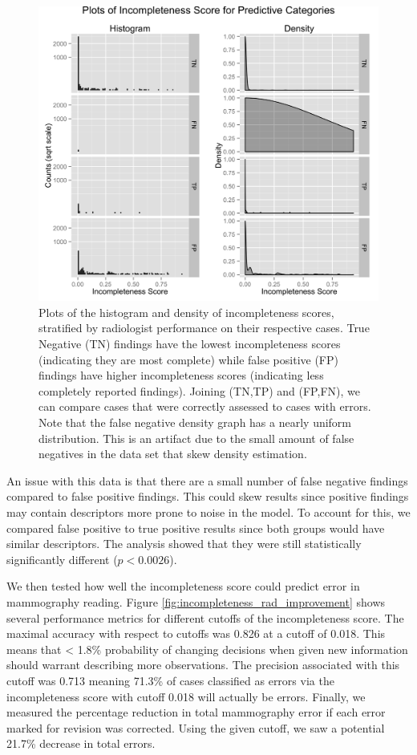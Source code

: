 \begin{figure}
\centering
\includegraphics[width=\linewidth]{figures/incompleteness_score_hist_confmat}
\caption{Plots of the histogram and density of incompleteness scores, stratified by radiologist performance on their respective cases. True Negative (TN) findings have the lowest incompleteness scores (indicating they are most complete) while false positive (FP) findings have higher incompleteness scores (indicating less completely reported findings). Joining (TN,TP) and (FP,FN), we can compare cases that were correctly assessed to cases with errors. Note that the false negative density graph has a nearly uniform distribution. This is an artifact due to the small amount of false negatives in the data set that skew density estimation.}
\label{fig:incompleteness_score_hist_confmat}
\end{figure}


An issue with this data is that there are a small number of false negative findings compared to false positive findings. This could skew results since positive findings may contain descriptors more prone to noise in the model. To account for this, we compared false positive to true positive results since both groups would have similar descriptors. The analysis showed that they were still statistically significantly different ($p<0.0026$).

\clearpage

We then tested how well the incompleteness score could predict error in mammography reading. Figure \ref{fig:incompleteness_rad_improvement} shows several performance metrics for different cutoffs of the incompleteness score. The maximal accuracy with respect to cutoffs was 0.826 at a cutoff of 0.018. This means that < 1.8\% probability of changing decisions when given new information should warrant describing more observations. The precision associated with this cutoff was 0.713 meaning 71.3\% of cases classified as errors via the incompleteness score with cutoff 0.018 will actually be errors. Finally, we measured the percentage reduction in total mammography error if each error marked for revision was corrected. Using the given cutoff, we saw a potential 21.7\% decrease in total errors.

